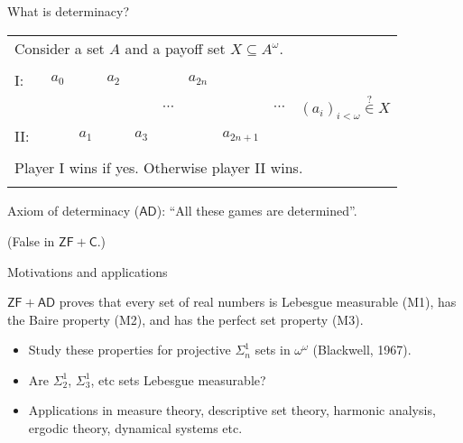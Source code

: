 \documentclass{beamer} %
\begin{document}
\begin{frame}{What is determinacy?}
    
    \begin{tabular}{llllllllll}
        \multicolumn{10}{l}{Consider a set $A$ and a payoff set $X \subseteq A^{\omega}$.}\\
        &&&&&&&&&\\
        I:\ & $a_0$ &       & $a_2$ &       &          &$a_{2n}$   &           & & \\
            &       &       &       &       & $\cdots$ &           &           & $\cdots$ & \qquad ${(a_i)}_{i < \omega} \overset{?}{\in} X$\\
        II:\ &       & $a_1$ &       & $a_3$ &          &           &$a_{2n+1}$ & & \\
        &&&&&&&&&\\
        \multicolumn{10}{l}{Player I wins if yes. Otherwise player II wins.} \\ 
        &&&&&&&&&\\
    \end{tabular}

    Axiom of determinacy ($\mathsf{AD}$): ``All these games are determined''.
    
    (False in $\mathsf{ZF + C}$.)
\end{frame}


\begin{frame}{Motivations and applications}

    \begin{theorem}
        $\mathsf{ZF + AD}$ proves  that every set of real numbers is Lebesgue measurable (M1), has 
        the Baire property (M2), and has the perfect set property (M3).
    \end{theorem}

    \begin{itemize}
        \item<2-> Study these properties for projective $\Sigma^1_n$ sets in $\omega^{\omega}$
        (Blackwell, 1967).
        \item<3-> Are $\Sigma^1_2$, $\Sigma^1_3$, etc sets Lebesgue measurable?
        \item<4> Applications in measure theory, descriptive set theory, harmonic analysis, ergodic theory, 
        dynamical systems etc.
    \end{itemize}

\end{frame}
\end{document}
